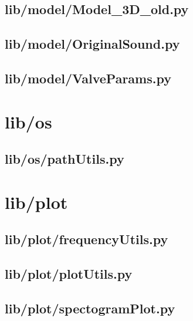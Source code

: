\subsection*{lib/model/Model\_3D\_old.py}
\label{ap:Model_3D_old}

\subsection*{lib/model/OriginalSound.py}
\label{ap:OriginalSound}

\subsection*{lib/model/ValveParams.py}
\label{ap:ValveParams}
\section{lib/os}

\subsection*{lib/os/pathUtils.py}
\label{ap:pathUtils}
\section{lib/plot}

\subsection*{lib/plot/frequencyUtils.py}
\label{ap:frequencyUtils}

\subsection*{lib/plot/plotUtils.py}
\label{ap:plotUtils}

\subsection*{lib/plot/spectogramPlot.py}
\label{ap:spectogramPlot}

